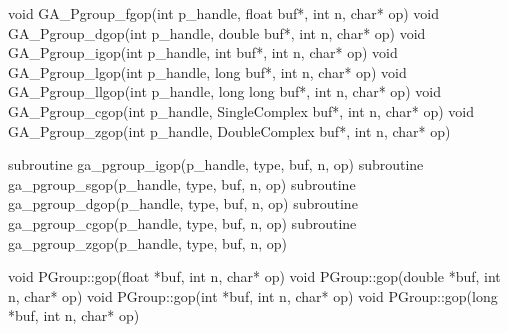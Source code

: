 \documentclass[10pt]{article}
\begin{document}


\begin{capi}
\begin{ccode}
void GA_Pgroup_fgop(int p_handle, float buf*, int n, char* op)
void GA_Pgroup_dgop(int p_handle, double buf*, int n, char* op)
void GA_Pgroup_igop(int p_handle, int buf*, int n, char* op)
void GA_Pgroup_lgop(int p_handle, long buf*, int n, char* op)
void GA_Pgroup_llgop(int p_handle, long long buf*, int n, char* op)
void GA_Pgroup_cgop(int p_handle, SingleComplex buf*, int n, char* op)
void GA_Pgroup_zgop(int p_handle, DoubleComplex buf*, int n, char* op)
\end{ccode}
\begin{funcargs}
\end{funcargs}
\end{capi}

\begin{fapi}
\begin{fcode}
subroutine ga_pgroup_igop(p_handle, type, buf, n, op)
subroutine ga_pgroup_sgop(p_handle, type, buf, n, op)
subroutine ga_pgroup_dgop(p_handle, type, buf, n, op)
subroutine ga_pgroup_cgop(p_handle, type, buf, n, op)
subroutine ga_pgroup_zgop(p_handle, type, buf, n, op)
\end{fcode}
\begin{funcargs}
\end{funcargs}
\end{fapi}

\begin{cxxapi}
\begin{cxxcode}
void PGroup::gop(float *buf, int n, char* op)
void PGroup::gop(double *buf, int n, char* op)
void PGroup::gop(int *buf, int n, char* op)
void PGroup::gop(long *buf, int n, char* op)
\end{cxxcode}
\begin{funcargs}
\end{funcargs}
\end{cxxapi}
\end{document}
